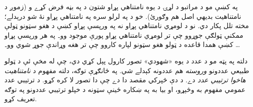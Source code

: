 \documentclass[../../../include/open-logic-section]{subfiles}
\begin{document}


په  کښې مو د مراتبو د لړۍ د يوه نامتناهي پړاو
شتون د \stagesinf{} په بڼه فرض کړے و (زموږ د نامتناهيت بديهي
اصل هم وګورئ). خو د \stagessucc{} په لرلو سره په نامتناهي پړاو
نۀ شو درېدلے؛ مخته تلل پکار دي. نو د لومړي نامتناهي پړاو نه په
ورپسې پړاو کښې د هغو سټونو ټولې ممکنې ټولګې جوړوو چې تر لومړي
نامتناهي پړاو پورې موجود وو۔ په هر ورپسې پړاو کښې همدا قاعده د
ټولو هغو سټونو لپاره کاروو چې تر هغه وړاندې جوړ شوي وو۔ \dots

دلته په پټه مو د عدد د يوه «شهودي» تصور کارول پېل کړي دي، چې
له مخې ئې د ټولو طبيعي عددونو \emph{وروسته} هم عددونه کېدلے شي.
په ځانګړې توګه، دلته مفهوم د \emph{نامتناهيت هاخوا ترتيبي عدد}
دے. د دې څپرکي مقصد دا دے چې دا تصور لا کره کړو. د ترتيبي عدد
عمومي مفهوم به وڅېړو، او بيا به په ښکاره ځينې سټونه د خپلو
ترتيبي عددونو په توګه تعريف کړو.
\end{document}
